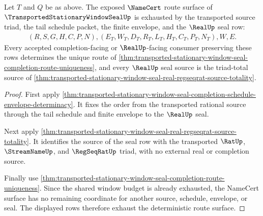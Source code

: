 \begin{theorem}
\label{thm:transported-stationary-window-seal-namecert-route-exhaustion}
Let $T$ and $Q$ be as above. The exposed $\NameCert$ route surface of $\TransportedStationaryWindowSealUp$ is exhausted by the transported source triad, the tail schedule packet, the finite envelope, and the $\RealUp$ seal row:
$$
\begin{aligned}
  (R,S,G,H,C,P,N),
  (E_T,W_T,D_T,R_T,L_T,H_T,C_T,P_T,N_T),
  W,E .
\end{aligned}
$$
Every accepted completion-facing or $\RealUp$-facing consumer preserving these rows determines the unique route of \autoref{thm:transported-stationary-window-seal-completion-route-uniqueness}, and every $\RealUp$ seal source is the triad-total source of \autoref{thm:transported-stationary-window-seal-real-regseqrat-source-totality}.
\end{theorem}
\begin{proof}
First apply \autoref{thm:transported-stationary-window-seal-completion-schedule-envelope-determinacy}. It fixes the order from the transported rational source through the tail schedule and finite envelope to the $\RealUp$ seal.

Next apply \autoref{thm:transported-stationary-window-seal-real-regseqrat-source-totality}. It identifies the source of the seal row with the transported $\RatUp$, $\StreamNameUp$, and $\RegSeqRatUp$ triad, with no external real or completion source.

Finally use \autoref{thm:transported-stationary-window-seal-completion-route-uniqueness}. Since the shared window budget is already exhausted, the NameCert surface has no remaining coordinate for another source, schedule, envelope, or seal. The displayed rows therefore exhaust the deterministic route surface.
\end{proof}

